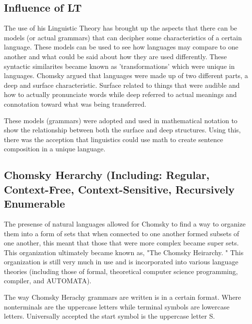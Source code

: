 \documentclass[conference]{IEEEtran}
\begin{document}
\subsection{Influence of LT}

The use of his Linguistic Theory has brought up the aspects that there can be models (or actual grammars) that can decipher some characteristics of a certain language. These models can be used to see how languages may compare to one another and what could be said about how they are used differently. These syntactic similarites became known as 'transformations' which were unique in languages. Chomsky argued that languages were made up of two different parts, a deep and surface characteristic. Surface related to things that were audible and how to actually pronunciate words while deep referred to actual meanings and connotation toward what was being transferred. 

These models (grammars) were adopted and used in mathematical notation to show the relationship between both the surface and deep structures. Using this, there was the acception that linguistics could use math to create sentence composition in a unique language. 

\subsection{Chomsky Herarchy (Including: Regular, Context-Free, Context-Sensitive, Recursively Enumerable}

The presense of natural languages allowed for Chomsky to find a way to organize them into a form of sets that when connected to one another formed subsets of one another, this meant that those that were more complex became super sets. This organization ultimately became known as, "The Chomsky Heirarchy. " This organization is still very much in use and is incorporated into various language theories (including those of formal, theoretical computer science programming, compiler, and AUTOMATA). 

The way Chomsky Herachy grammars are written is in a certain format. Where nonterminals are the uppercase letters while terminal symbols are lowercase letters. Universally accepted the start symbol is the uppercase letter S. 
\end{document}
